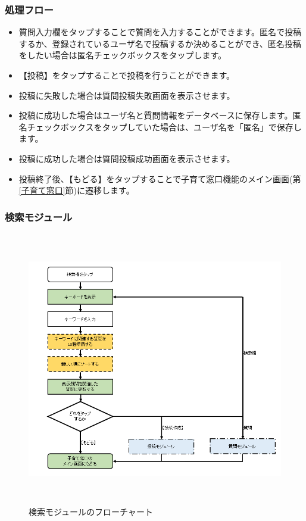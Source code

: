 \documentclass[a4j]{jarticle}
\begin{document}
\subsubsection*{処理フロー}
\begin{itemize}
\item 質問入力欄をタップすることで質問を入力することができます。匿名で投稿するか、登録されているユーザ名で投稿するか決めることができ、匿名投稿をしたい場合は匿名チェックボックスをタップします。
\item 【投稿】をタップすることで投稿を行うことができます。
\item 投稿に失敗した場合は質問投稿失敗画面を表示させます。
\item 投稿に成功した場合はユーザ名と質問情報をデータベースに保存します。匿名チェックボックスをタップしていた場合は、ユーザ名を「匿名」で保存します。
\item 投稿に成功した場合は質問投稿成功画面を表示させます。
\item 投稿終了後、【もどる】をタップすることで子育て窓口機能のメイン画面(第\ref{子育て窓口}節)に遷移します。

\end{itemize}

\newpage
\subsubsection{検索モジュール\label{検索}} %
\begin{figure}[H]
    \begin{center}
      \includegraphics[height = 12.0cm] {子育て窓口_検索.png} %
    \caption {検索モジュールのフローチャート}
    \label{子育て窓口_検索}
    \end{center}
\end{figure}
\end{document}
